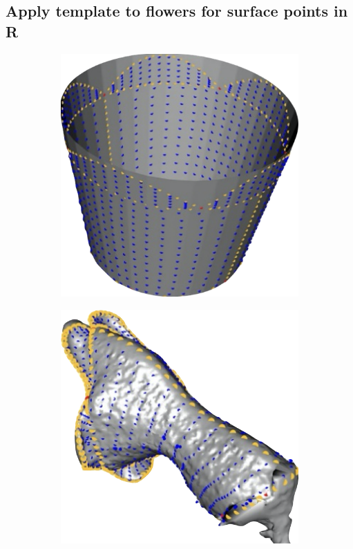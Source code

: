 \documentclass[10pt,letter,english]{article}
\begin{document}
\subsection{Apply template to flowers for surface points in R}

\begin{figure}[H]
\centering
\begin{subfigure}[t]{.5\textwidth}
  \centering
  \includegraphics[width=.5\textwidth]{Figures/template_geometric_morphometrics.png}
  \caption{}
  \label{}
\end{subfigure}%
\begin{subfigure}[t]{.5\textwidth}
  \centering
  \includegraphics[width=.5\textwidth]{Figures/flower_geometric_morphometrics.png}
  \caption{}
  \label{}
\end{subfigure}
\caption{}
\label{}
\end{figure}







\newpage

\end{document}
